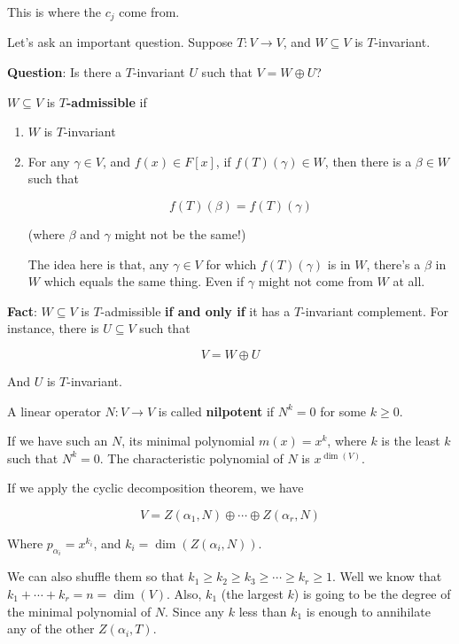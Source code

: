 \documentclass[12pt]{article}
\begin{document}
  This is where the $c_j$ come from.


  Let's ask an important question. Suppose $T: V \to V$, and $W \subseteq V$ is
  $T$-invariant.

  {\bf Question}: Is there a $T$-invariant $U$ such that $V = W \oplus U$?

  \Definition{}
  {
    $W \subseteq V$ is {\bf $T$-admissible} if

    \begin{enumerate}
      \item $W$ is $T$-invariant
      \item For any $\gamma \in V$, and $f(x) \in F[x]$, if $f(T)(\gamma) \in
        W$, then there is a $\beta \in W$ such that

        \[
          f(T)(\beta) = f(T)(\gamma)
        \]

        (where $\beta$ and $\gamma$ might not be the same!)

        The idea here is that, any $\gamma \in V$ for which $f(T)(\gamma)$ is in
        $W$, there's a $\beta$ in $W$ which equals the same thing. Even if
        $\gamma$ might not come from $W$ at all.
    \end{enumerate}
  }

  {\bf Fact}: $W \subseteq V$ is $T$-admissible {\bf if and only if} it has a
  $T$-invariant complement. For instance, there is $U \subseteq V$ such that

  \[
    V = W \oplus U
  \]

  And $U$ is $T$-invariant.

  \Definition{}
  {
    A linear operator $N: V \to V$ is called {\bf nilpotent} if $N^k = 0$ for
    some $k \ge 0$.
  }

  If we have such an $N$, its minimal polynomial $m(x) = x^k$, where $k$ is the
  least $k$ such that $N^k = 0$. The characteristic polynomial of $N$ is
  $x^{\dim(V)}$.

  If we apply the cyclic decomposition theorem, we have

  \[
    V = Z(\alpha_1, N) \oplus \cdots \oplus Z(\alpha_r, N)
  \]

  Where $p_{\alpha_i} = x^{k_i}$, and $k_i = \dim(Z(\alpha_i, N))$.

  We can also shuffle them so that $k_1 \ge k_2 \ge k_3 \ge \cdots \ge k_r \ge
  1$. Well we know that $k_1 + \cdots + k_r = n = \dim(V)$. Also, $k_1$ (the
  largest $k$) is going to be the degree of the minimal polynomial of $N$. Since
  any $k$ less than $k_1$ is enough to annihilate any of the other $Z(\alpha_i,
  T)$.
\end{document}
